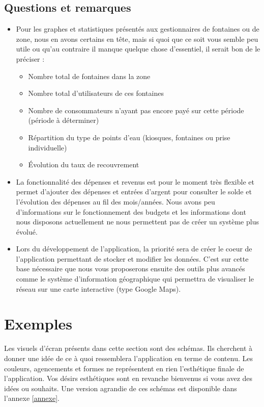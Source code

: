 \documentclass[a4paper, 11pt]{article}
\begin{document}
  \subsection{Questions et remarques}
  \begin{itemize}
    \item Pour les graphes et statistiques présentés aux gestionnaires de fontaines ou de zone, nous en avons certains en tête, mais si quoi que ce soit vous semble peu utile ou qu'au contraire il manque quelque chose d'essentiel, il serait bon de le préciser :
    \begin{itemize}
      \item Nombre total de fontaines dans la zone
      \item Nombre total d'utilisateurs de ces fontaines
      \item Nombre de consommateurs n'ayant pas encore payé sur cette période (période à déterminer)
      \item Répartition du type de points d'eau (kiosques, fontaines ou prise individuelle)
      \item Évolution du taux de recouvrement
    \end{itemize}
    \item La fonctionnalité des dépenses et revenus est pour le moment très flexible et permet d'ajouter des dépenses et entrées d'argent pour consulter le solde et l'évolution des dépenses au fil des mois/années. Nous avons peu d'informations sur le fonctionnement des budgets et les informations dont nous disposons actuellement ne nous permettent pas de créer un système plus évolué.
    \item Lors du développement de l'application, la priorité sera de créer le coeur de l'application permettant de stocker et modifier les données. C'est sur cette base nécessaire que nous vous proposerons ensuite des outils plus avancés comme le système d'information géographique qui permettra de visualiser le réseau sur une carte interactive (type Google Maps).
  \end{itemize}

\section{Exemples}
  \begin{shaded}
    Les visuels d'écran présents dans cette section sont des schémas. Ils cherchent à donner une idée de ce à quoi ressemblera l'application en terme de contenu. Les couleurs, agencements et formes ne représentent en rien l'esthétique finale de l'application. Vos désirs esthétiques sont en revanche bienvenus si vous avez des idées ou souhaits. Une version agrandie de ces schémas est disponible dans l'annexe \ref{annexe}.
  \end{shaded}
\end{document}
